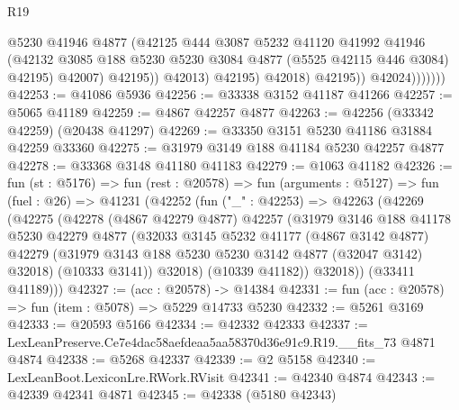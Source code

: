 \begin{lexlean}{R19}
\begin{coremodule}
                                @5230
                                @41946
                                @4877
                                (@42125
                                  @444
                                  @3087
                                  @5232
                                  @41120
                                  @41992
                                  @41946
                                  (@42132
                                    @3085
                                    @188
                                    @5230
                                    @5230
                                    @3084
                                    @4877
                                    (@5525 @42115 @446 @3084)
                                    @42195)
                                  @42007)
                                @42195))
                            @42013)
                          @42195)
                        @42018)
                      @42195))
                  @42024)))))))
@42253 := @41086 @5936
@42256 := @33338 @3152 @41187 @41266
@42257 := @5065 @41189
@42259 := @4867 @42257 @4877
@42263 := @42256 (@33342 @42259) (@20438 @41297)
@42269 := @33350 @3151 @5230 @41186 @31884 @42259 @33360
@42275 := @31979 @3149 @188 @41184 @5230 @42257 @4877
@42278 := @33368 @3148 @41180 @41183
@42279 := @1063 @41182
@42326 := fun (st : @5176) =>
  fun (rest : @20578) =>
  fun (arguments : @5127) =>
  fun (fuel : @26) =>
  @41231
    (@42252
      (fun ("_" : @42253) =>
      @42263
        (@42269
          (@42275
            (@42278
              (@4867 @42279 @4877)
              @42257
              (@31979
                @3146
                @188
                @41178
                @5230
                @42279
                @4877
                (@32033
                  @3145
                  @5232
                  @41177
                  (@4867 @3142 @4877)
                  @42279
                  (@31979 @3143 @188 @5230 @5230 @3142 @4877 (@32047 @3142) @32018)
                  (@10333 @3141))
                @32018)
              (@10339 @41182))
            @32018))
        (@33411 @41189)))
@42327 := (acc : @20578) -> @14384
@42331 := fun (acc : @20578) => fun (item : @5078) => @5229 @14733 @5230
@42332 := @5261 @3169
@42333 := @20593 @5166
@42334 := @42332 @42333
@42337 := LexLeanPreserve.Ce7e4dac58aefdeaa5aa58370d36e91c9.R19.__fits_73 @4871 @4874
@42338 := @5268 @42337
@42339 := @2 @5158
@42340 := LexLeanBoot.LexiconLre.RWork.RVisit
@42341 := @42340 @4874
@42343 := @42339 @42341 @4871
@42345 := @42338 (@5180 @42343)

\end{coremodule}
\end{lexlean}
